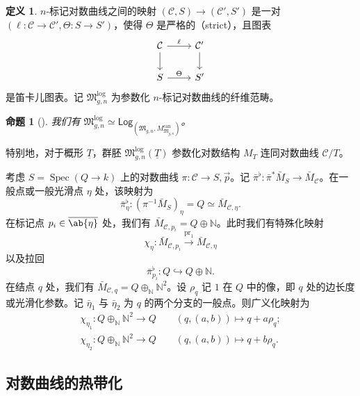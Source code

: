 \documentclass{amsart}
\newtheorem{prop}[thm]{命题}
\theoremstyle{definition}
\newtheorem{defn}[thm]{定义}
\theoremstyle{remark}
\theoremstyle{plain}
\theoremstyle{definition}
\theoremstyle{remark}
\newcommand{\N}{\mathbb{N}}
\newcommand{\mc}[1]{\mathcal{#1}}
\newcommand{\mf}[1]{\mathfrak{#1}}
\newcommand{\on}[1]{\operatorname{#1}}
\newcommand{\ms}[1]{\mathsf{#1}}
\newcommand{\ol}[1]{\overline{#1}}
\newcommand{\ul}[1]{\underline{#1}}
\newcommand{\1}{\mathbf{1}}
\newcommand{\2}{\mathbf{2}}
\newcommand{\3}{\mathbf{3}}
\DeclareMathOperator{\Spec}{Spec}
\begin{document}
\begin{defn}
    \(n\)-标记对数曲线之间的映射 \((\mc{C}, S) \to (\mc{C}', S')\) 是一对 \((\ell \colon \mc{C} \to \mc{C}', \Theta \colon S \to S')\)，使得 \(\Theta\) 是严格的（strict），且图表
    \begin{equation*}
    \begin{tikzcd}
        \mc{C} \ar{d} \ar{r}{\ell} & \mc{C}' \ar{d} \\
        S \ar{r}{\Theta} & S'
    \end{tikzcd}
    \end{equation*}
    是笛卡儿图表。记 \(\mf{M}_{g,n}^{\log}\) 为参数化 \(n\)-标记对数曲线的纤维范畴。
\end{defn}

\begin{prop}[{\cite{FKato2000,Olsson2003}}]
    我们有 \(\mf{M}_{g,n}^{\log} \simeq \ms{Log}_{(\mf{M}_{g,n}, M_{\mf{M}_{g,n}}^{\on{can}})}\)。
\end{prop}

特别地，对于概形 \(\ul{T}\)，群胚 \(\mf{M}_{g,n}^{\log}(\ul{T})\) 参数化对数结构 \(M_T\) 连同对数曲线 \(\mc{C} / T\)。

考虑 \(S = \Spec (Q \to k)\) 上的对数曲线 \(\pi \colon \mc{C} \to S, \vec{p}\)。记 \(\bar{\pi}^{\flat} \colon \bar{\pi}^* \bar{M}_S \to \bar{M}_{\mc{C}}\)。在一般点或一般光滑点 \(\eta\) 处，该映射为
\[ \bar{\pi}_{\eta}^{\flat} \colon (\pi^{-1} \bar{M}_S)_{\eta} = Q \simeq \bar{M}_{\mc{C}, \eta}. \]
在标记点 \(p_i \in \ol{\ab\{\eta\}}\) 处，我们有 \(\bar{M}_{\mc{C}, p_i} = Q \oplus \N\)。此时我们有特殊化映射
\[ \chi_{\eta} \colon \bar{M}_{\mc{C}, p_i} \xrightarrow{\on{pr}_1} \bar{M}_{\mc{C}, \eta} \]
以及拉回
\[ \bar{\pi}_{p_i}^{\flat} \colon Q \hookrightarrow Q \oplus \N. \]
在结点 \(q\) 处，我们有 \(\bar{M}_{\mc{C}, q} = Q \oplus_{\N} \N^2\)。设 \(\rho_q\) 记 \(1\) 在 \(Q\) 中的像，即 \(q\) 处的边长度或光滑化参数。记 \(\bar{\eta}_1\) 与 \(\bar{\eta}_2\) 为 \(q\) 的两个分支的一般点。则广义化映射为
\begin{align*}
    \chi_{\eta_1} \colon Q \oplus_{\N} \N^2 \to Q \qquad (q, (a,b)) \mapsto q + a \rho_q ;\\
    \chi_{\eta_2} \colon Q \oplus_{\N} \N^2 \to Q \qquad (q, (a,b)) \mapsto q + b \rho_q .
\end{align*}

\subsection{对数曲线的热带化}%
\label{sub:Tropicalization of log curves}
\end{document}
